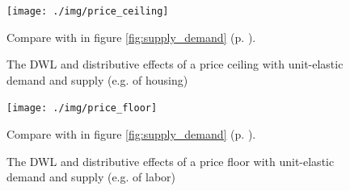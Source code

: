 \begin{figure}[htbp]
	\begin{center}
	\texttt{[image: ./img/price\_ceiling]}  
	\caption[Efficiency and Equity of a Price Ceiling]{The \gls{DWL} and distributive effects of a price ceiling with unit-elastic demand and supply (e.g. of housing)}	
	\end{center}
	\scriptsize{Compare with  in figure \ref{fig:supply_demand} (p. \pageref{fig:supply_demand}).}
	\label{fig:price_ceiling}
\end{figure}

\begin{figure}[htbp]
	\begin{center}
	\texttt{[image: ./img/price\_floor]}  
	\caption[Efficiency and Equity of a Price Floor]{The \gls{DWL} and distributive effects of a price floor with unit-elastic demand and supply (e.g. of labor)}
	\end{center}
	\scriptsize{Compare with  in figure \ref{fig:supply_demand} (p. \pageref{fig:supply_demand}).}
	\label{fig:price_floor}
\end{figure}

